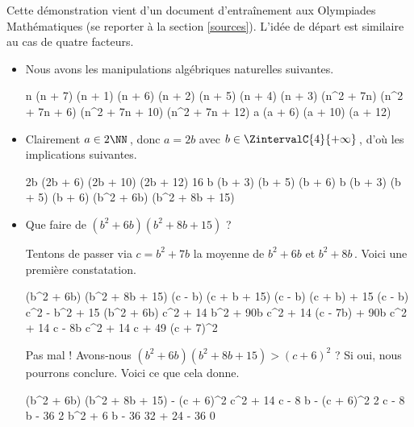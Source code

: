 Cette démonstration vient d'un document d'entraînement aux Olympiades Mathématiques (se reporter à la section \ref{sources}).
L'idée de départ est similaire au cas de quatre facteurs.

\begin{itemize}
	\item Nous avons les manipulations algébriques naturelles suivantes.

    \medskip
    \noindent\kern-6pt%
    \begin{stepcalc}[style = sar]
    \explnext{}
    	n (n + 7) \cdot (n + 1) (n + 6) \cdot (n + 2) (n + 5) \cdot (n + 4) (n + 3) 
    \explnext{}
    	(n^2 + 7n) (n^2 + 7n + 6) (n^2 + 7n + 10) (n^2 + 7n + 12) 
    	a (a + 6) (a + 10) (a + 12)
    \end{stepcalc}


	\item Clairement $a \in 2 \NN$\,, donc $a = 2b$ avec $b \in \ZintervalC{4}{+\infty}$\,, d'où les implications suivantes.

    \medskip
    \noindent\kern-10pt%
    \begin{stepcalc}[style = ar*, ope=\implies]
    	 \in \NNssquare
    \explnext{}
    	2b (2b + 6) (2b + 10) (2b + 12) \in \NNssquare
    \explnext{}
    	16 b (b + 3) (b + 5) (b + 6) \in \NNssquare
    	b (b + 3) (b + 5) (b + 6) \in \NNssquare
    	(b^2 + 6b) (b^2 + 8b + 15) \in \NNssquare
    \end{stepcalc}


	\item Que faire de $(b^2 + 6b) (b^2 + 8b + 15)$ ?

    \smallskip
    \noindent%
    Tentons de passer via $c = b^2 + 7b$ la moyenne de $b^2 + 6b$ et $b^2 + 8b$\,. Voici une première constatation.

    \medskip
    \noindent\kern-10pt%
    \begin{stepcalc}[style = ar*]
    	(b^2 + 6b) (b^2 + 8b + 15)
    \explnext{}
    	(c - b) (c + b + 15)
    \explnext{}
    	(c - b) (c + b) + 15 (c - b)
    \explnext{}
    	c^2 - b^2 + 15 (b^2 + 6b)
    \explnext{}
    	c^2 + 14 b^2 + 90b
    \explnext{}
    	c^2 + 14 (c - 7b) + 90b
    \explnext{}
    	c^2 + 14 c - 8b
    \explnext[<]{}
    	c^2 + 14 c + 49
    \explnext[<]{}
    	(c + 7)^2
    \end{stepcalc}
    
    \smallskip
    \noindent
    Pas mal ! Avons-nous $(b^2 + 6b) (b^2 + 8b + 15) > (c + 6)^2$ ? Si oui, nous pourrons conclure. Voici ce que cela donne.

    \medskip
    \noindent\kern-10pt%
    \begin{stepcalc}[style = ar*]
    	(b^2 + 6b) (b^2 + 8b + 15) - (c + 6)^2
    \explnext{}
    	c^2 + 14 c - 8 b - (c + 6)^2
    \explnext{}
    	2 c - 8 b - 36
    \explnext{}
    	2 b^2 + 6 b - 36
    	32 + 24 - 36
    \explnext[>]{}
    	0
    \end{stepcalc}
\end{itemize}

\vspace{-2ex}	
\leavevmode